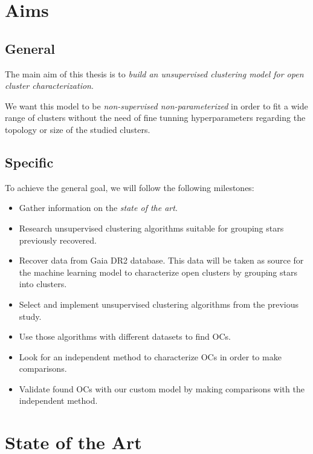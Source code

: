 \documentclass[11pt, a4paper, english]{book}
\begin{document}
\chapter{Aims}

\section{General}

The main aim of this thesis is to \emph{build an unsupervised clustering model for open cluster characterization}.

We want this model to be \emph{non-supervised non-parameterized} in order to fit a wide range of clusters without
the need of fine tunning hyperparameters regarding the topology or size of the studied clusters.

\section{Specific}

To achieve the general goal, we will follow the following milestones:

\begin{itemize}
  \item Gather information on the \emph{state of the art}.
  \item Research unsupervised clustering algorithms suitable for grouping stars previously recovered.
  \item Recover data from Gaia DR2 database. This data will be taken as source for the machine learning model to characterize open clusters
  by grouping stars into clusters.
  \item Select and implement unsupervised clustering algorithms from the previous study.
  \item Use those algorithms with different datasets to find OCs.
  \item Look for an independent method to characterize OCs in order to make comparisons.
  \item Validate found OCs with our custom model by making comparisons with the independent method.
\end{itemize}


\chapter{State of the Art}
\end{document}
